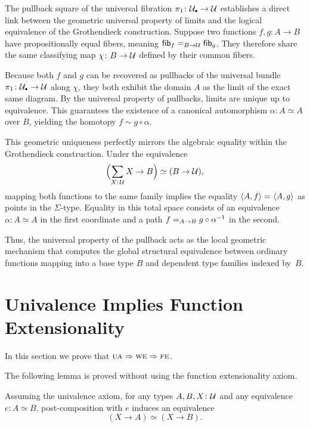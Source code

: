 \begin{rem}
    The pullback square of the universal fibration $\pi_1\colon\puniv\to\univ$ establishes a direct link between the geometric universal property of limits and the logical equivalence of the Grothendieck construction. Suppose two functions $f,g\colon A\to B$ have propositionally equal fibers, meaning $\mathsf{fib}_f\mathrel{=_{B\to\mathcal U}}\mathsf{fib}_g$. They therefore share the same classifying map $\chi\colon B\to\univ$ defined by their common fibers.

    Because both $f$ and $g$ can be recovered as pullbacks of the universal bundle $\pi_1\colon\puniv\to\univ$ along $\chi$, they both exhibit the domain $A$ as the limit of the exact same diagram. By the universal property of pullbacks, limits are unique up to equivalence. This guarantees the existence of a canonical automorphism $\alpha\colon A\simeq A$ over $B$, yielding the homotopy $f\sim g\circ\alpha$.

    This geometric uniqueness perfectly mirrors the algebraic equality within the Grothendieck construction. Under the equivalence
    \[
        \Bigl(\sum_{X\colon\univ}X\to B\Bigr)\simeq(B\to\univ),
    \]
    mapping both functions to the same family implies the equality $\langle A,f\rangle\mathrel{=_{}}\langle A,g\rangle$ as points in the $\Sigma$-type. Equality in this total space consists of an equivalence $\alpha\colon A\simeq A$ in the first coordinate and a path $f\mathrel{=_{A\to B}}g\circ\alpha^{-1}$ in the second.
    
    Thus, the universal property of the pullback acts as the local geometric mechanism that computes the global structural equivalence between ordinary functions mapping into a base type $B$ and dependent type families indexed by~$B$.
\end{rem}

\section{Univalence Implies Function Extensionality}\label{UA-implies-FE}

In this section we prove that $\text{\upshape\textsc{ua}}\Rightarrow\text{\upshape\textsc{we}}\Rightarrow\text{\upshape\textsc{fe}}$.

\begin{rem}
    The following lemma is proved without using the function extensionality axiom.
\end{rem}

\begin{lem}\ua\label{lem:base-equivalence-implies-bundle-equivalence}
    Assuming the univalence axiom, for any types\/ $A,B,X\colon\univ$ and any equivalence\/ $e\colon A\simeq B$, post-composition with\/ $e$ induces an equivalence
    \[
        (X\to A)\simeq(X\to B).
    \]
\end{lem}

